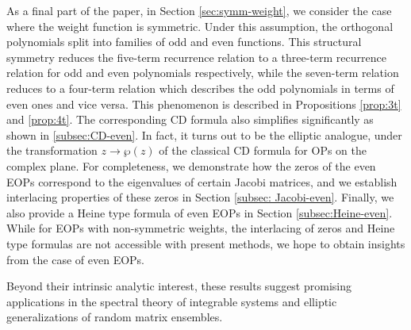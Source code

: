 \documentclass[11pt,a4paper]{article}
\theoremstyle{definition}
\numberwithin{equation}{section}
\numberwithin{theorem}{section}
\begin{document}
As a final part of the paper, in Section \ref{sec:symm-weight}, we consider the case where the weight function is symmetric. Under this assumption, the orthogonal polynomials split into families of odd and even functions. This structural symmetry reduces the five-term recurrence relation to a three-term recurrence relation for odd and even polynomials respectively, while the seven-term relation reduces to a four-term relation which describes the odd polynomials in terms of even ones and vice versa. This phenomenon is described in Propositions \ref{prop:3t} and \ref{prop:4t}. The corresponding CD formula also simplifies significantly as shown in \ref{subsec:CD-even}. In fact, it turns out to be the elliptic analogue, under the transformation $z\to \wp(z)$ of the classical CD formula for OPs on the complex plane. For completeness, we demonstrate how the zeros of the even EOPs correspond to the eigenvalues of certain Jacobi matrices, and we establish interlacing properties of these zeros in Section \ref{subsec: Jacobi-even}. Finally, we also provide a Heine type formula of even EOPs in Section \ref{subsec:Heine-even}. While for EOPs with non-symmetric weights, the interlacing of zeros and Heine type formulas are not accessible with present methods, we hope to obtain insights from the case of even EOPs.

Beyond their intrinsic analytic interest, these results suggest promising applications in the spectral theory of integrable systems and elliptic generalizations of random matrix ensembles.
\end{document}
